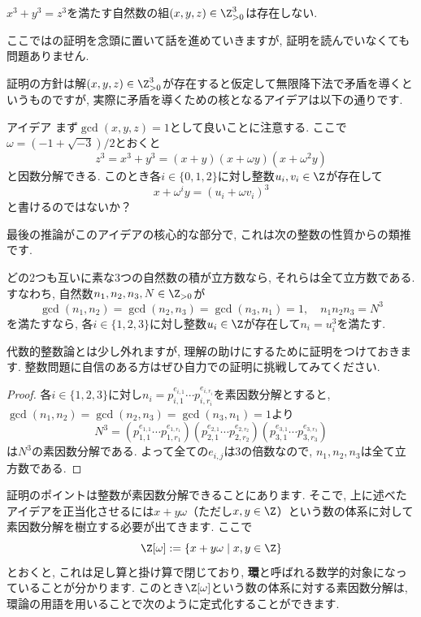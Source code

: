 \documentclass[11pt,b5paper,oneside,titlepage,lualatex]{ltjsreport}
\begin{document}
\begin{theorem}{}{}
	$ x^3 + y^3 = z^3 $を満たす自然数の組$ (x, y, z) \in \Z_{>0}^3 $は存在しない.
\end{theorem}

ここでは\cite[系8.7.6]{Yukie1}の証明を念頭に置いて話を進めていきますが, 証明を読んでいなくても問題ありません. 

証明の方針は解$ (x, y, z) \in \Z_{>0}^3 $が存在すると仮定して無限降下法で矛盾を導くというものですが, 実際に矛盾を導くための核となるアイデアは以下の通りです. 

\begin{simplesquarebox}{アイデア}
	まず$ \gcd(x, y, z) = 1 $として良いことに注意する. 
	ここで$ \omega = (-1+\sqrt{-3})/2 $とおくと
	\[
	z^3 = x^3 + y^3 = (x + y) (x + \omega y) (x + \omega^2 y)
	\]
	と因数分解できる. 
	このとき各$ i \in \{ 0, 1, 2 \} $に対し整数$ u_i, v_i \in \Z $が存在して
	\[
	x + \omega^i y = (u_i + \omega v_i)^3
	\]
	と書けるのではないか？
\end{simplesquarebox}

最後の推論がこのアイデアの核心的な部分で, これは次の整数の性質からの類推です. 

\begin{lemma}{}{}
	どの2つも互いに素な3つの自然数の積が立方数なら, それらは全て立方数である. 
	すなわち, 自然数$ n_1, n_2, n_3, N \in \Z_{>0} $が
	\[
	\gcd(n_1, n_2) = \gcd(n_2, n_3) = \gcd(n_3, n_1) = 1, \quad
	n_1 n_2 n_3 = N^3
	\]
	を満たすなら, 各$ i \in \{ 1, 2, 3 \} $に対し整数$ u_i \in \Z $が存在して$ n_i = u_i^3 $を満たす. 
\end{lemma}

代数的整数論とは少し外れますが, 理解の助けにするために証明をつけておきます. 
整数問題に自信のある方はぜひ自力での証明に挑戦してみてください. 

\begin{proof}
	各$ i \in \{ 1, 2, 3 \} $に対し$ n_i = p_{i, 1}^{e_{i, 1}} \cdots p_{i, r_i}^{e_{i, r_i}} $を素因数分解とすると, 
	$ \gcd(n_1, n_2) = \gcd(n_2, n_3) = \gcd(n_3, n_1) = 1 $より
	\[
	N^3 = \left( p_{1, 1}^{e_{1, 1}} \cdots p_{1, r_1}^{e_{1, r_1}} \right) \left( p_{2, 1}^{e_{2, 1}} \cdots p_{2, r_2}^{e_{2, r_2}} \right) \left( p_{3, 1}^{e_{3, 1}} \cdots p_{3, r_3}^{e_{3, r_3}} \right)
	\]
	は$ N^3 $の素因数分解である. 
	よって全ての$ e_{i, j} $は3の倍数なので, $ n_1, n_2, n_3 $は全て立方数である. 
\end{proof}

証明のポイントは整数が素因数分解できることにあります. 
そこで, 上に述べたアイデアを正当化させるには$ x + y\omega $（ただし$ x, y \in \Z $）という数の体系に対して素因数分解を樹立する必要が出てきます. 
ここで
\[
\Z[\omega] := \{ x + y\omega \mid x, y \in \Z \}
\]
とおくと, これは足し算と掛け算で閉じており, \textbf{環}と呼ばれる数学的対象になっていることが分かります. 
このとき$ \Z[\omega] $という数の体系に対する素因数分解は, 環論の用語を用いることで次のように定式化することができます. 
\end{document}
